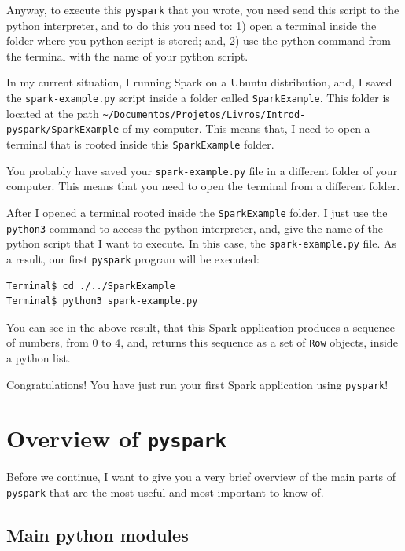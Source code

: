\documentclass[
  11pt,
  letterpaper,
  DIV=11,
  numbers=noendperiod]{scrreprt}
\begin{document}
Anyway, to execute this \texttt{pyspark} that you wrote, you need send
this script to the python interpreter, and to do this you need to: 1)
open a terminal inside the folder where you python script is stored;
and, 2) use the python command from the terminal with the name of your
python script.

In my current situation, I running Spark on a Ubuntu distribution, and,
I saved the \texttt{spark-example.py} script inside a folder called
\texttt{SparkExample}. This folder is located at the path
\texttt{\textasciitilde{}/Documentos/Projetos/Livros/Introd-pyspark/SparkExample}
of my computer. This means that, I need to open a terminal that is
rooted inside this \texttt{SparkExample} folder.

You probably have saved your \texttt{spark-example.py} file in a
different folder of your computer. This means that you need to open the
terminal from a different folder.

After I opened a terminal rooted inside the \texttt{SparkExample}
folder. I just use the \texttt{python3} command to access the python
interpreter, and, give the name of the python script that I want to
execute. In this case, the \texttt{spark-example.py} file. As a result,
our first \texttt{pyspark} program will be executed:

\begin{verbatim}
Terminal$ cd ./../SparkExample
Terminal$ python3 spark-example.py
\end{verbatim}

You can see in the above result, that this Spark application produces a
sequence of numbers, from 0 to 4, and, returns this sequence as a set of
\texttt{Row} objects, inside a python list.

Congratulations! You have just run your first Spark application using
\texttt{pyspark}!

\hypertarget{overview-of-pyspark}{%
\section{\texorpdfstring{Overview of
\texttt{pyspark}}{Overview of pyspark}}\label{overview-of-pyspark}}

Before we continue, I want to give you a very brief overview of the main
parts of \texttt{pyspark} that are the most useful and most important to
know of.

\hypertarget{main-python-modules}{%
\subsection{Main python modules}\label{main-python-modules}}
\end{document}
